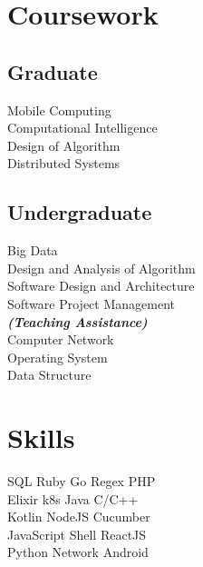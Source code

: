 \documentclass[letterpaper]{deedy-resume} %
\begin{document}
\begin{minipage}[t]{0.33\textwidth}

\section{Coursework}

\subsection{Graduate}
Mobile Computing \\
Computational Intelligence \\
Design of Algorithm \\
Distributed Systems \\
\sectionspace

\subsection{Undergraduate}
Big Data \\
Design and Analysis of Algorithm \\
Software Design and Architecture \\
Software Project Management \\
{\footnotesize \textit{\textbf{(Teaching Assistance) }}} \\
Computer Network \\
Operating System \\
Data Structure
\sectionspace


\section{Skills}

SQL \textbullet{} Ruby \textbullet{} Go \textbullet{} Regex \textbullet{} PHP\\
Elixir \textbullet{} k8s \textbullet{} Java \textbullet{} C/C++ \\
Kotlin \textbullet{} NodeJS \textbullet{} Cucumber \\
JavaScript \textbullet{} Shell \textbullet{} ReactJS \\
Python \textbullet{} Network \textbullet{} Android
\sectionspace

\end{minipage} %
\end{document}
